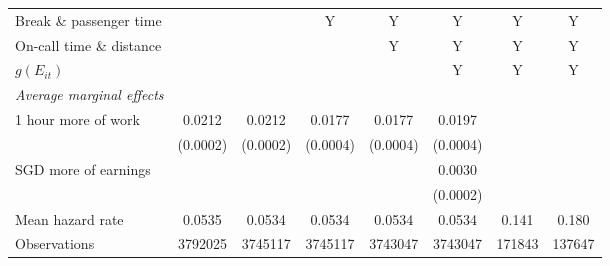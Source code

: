 \documentclass[reviewmode,AEJ]{AEA}
\begin{document}
\begin{table}[htb]
{\begin{tabularx}{\textwidth}{l@{\extracolsep{\fill}}*{7}{S[table-format = 0.4, table-space-text-pre={**}, table-space-text-post={-**}]}}
			Break \& passenger time         & {}                      & {}                      & {Y}                     & {Y}                     & {Y}                     &  {Y}                             &    {Y}                           \\
			On-call time \& distance        & {}                      & {}                      & {}                      & {Y}                     & {Y}                     & {Y}                              &    {Y}                           \\
			\(g(E_{it})\)                   & {}                      & {}                      & {}                      & {}                      & {Y}                     &    {Y}                           &     {Y}                          \\ \midrule
			\textit{Average marginal effects}            &                         &                         &                         &                         &                         &                               &                        \\
			1 hour more of work             & 0.0212\sym{***}         & 0.0212\sym{***}         & 0.0177\sym{***}         & 0.0177\sym{***}         & 0.0197\sym{***}         &                               &                               \\
			                                & (0.0002)                & (0.0002)                & (0.0004)                & (0.0004)                & (0.0004)                &                               &                         \\
			 SGD more of earnings         &                         &                         &                         &                         & 0.0030\sym{***}         &                               &                               \\
			                                &                         &                         &                         &                         & (0.0002)                &                               &                         \\ 
		   \midrule
			Mean hazard rate                & 0.0535                  & 0.0534                  & 0.0534                  & 0.0534                  & 0.0534                  & \num{0.141}                   & \num{0.180}                   \\
			Observations                    & \num{3792025}           & \num{3745117}           & \num{3745117}           & \num{3743047}           & \num{3743047}           & \num{171843}                  & \num{137647}                  \\

\end{tabularx}}
\end{table}
\end{document}
